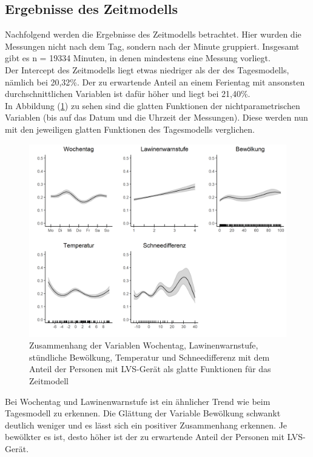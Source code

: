 \documentclass[12pt]{scrreprt}
\begin{document}
\subsection{Ergebnisse des Zeitmodells}
Nachfolgend werden die Ergebnisse des Zeitmodells betrachtet. Hier wurden die Messungen nicht nach dem Tag, sondern nach der Minute gruppiert. Insgesamt gibt es n = 19334 Minuten, in denen mindestens eine Messung vorliegt. \\
Der Intercept des Zeitmodells liegt etwas niedriger als der des Tagesmodells, nämlich bei 20,32\%. Der zu erwartende Anteil an einem Ferientag mit ansonsten durchschnittlichen Variablen ist dafür höher und liegt bei 21,40\%. \\
In Abbildung (\ref{pic:smooth_time_model}) zu sehen sind die glatten Funktionen der nichtparametrischen Variablen (bis auf das Datum und die Uhrzeit der Messungen). Diese werden nun mit den jeweiligen glatten Funktionen des Tagesmodells verglichen.
\begin{figure}[H]
	\centering
	\includegraphics[width=\linewidth]{plots/smooth_time_model}
	\caption{Zusammenhang der Variablen Wochentag, Lawinenwarnstufe, stündliche Bewölkung, Temperatur und Schneedifferenz mit dem Anteil der Personen mit LVS-Gerät als glatte Funktionen für das Zeitmodell}
	\label{pic:smooth_time_model}	
\end{figure}
\noindent Bei Wochentag und Lawinenwarnstufe ist ein ähnlicher Trend wie beim Tagesmodell zu erkennen. Die Glättung der Variable Bewölkung schwankt deutlich weniger und es lässt sich ein positiver Zusammenhang erkennen. Je bewölkter es ist, desto höher ist der zu erwartende Anteil der Personen mit LVS-Gerät. \\
\end{document}
